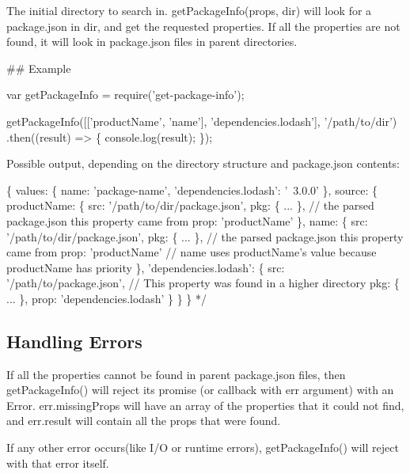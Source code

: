 The initial directory to search in. {\ttfamily get\+Package\+Info(props, dir)} will look for a package.\+json in {\ttfamily dir}, and get the requested properties. If all the properties are not found, it will look in package.\+json files in parent directories.

\#\# Example 
\begin{DoxyCode}
var getPackageInfo = require('get-package-info');

getPackageInfo([['productName', 'name'], 'dependencies.lodash'], '/path/to/dir')
.then((result) => \{
    console.log(result);
\});
\end{DoxyCode}


Possible output, depending on the directory structure and package.\+json contents\+:


\begin{DoxyCode}
\{
    values: \{
        name: 'package-name',
        'dependencies.lodash': '~3.0.0'
    \},
    source: \{
        productName: \{
            src: '/path/to/dir/package.json',
            pkg: \{ ... \}, // the parsed package.json this property came from
            prop: 'productName'
        \},
        name: \{
            src: '/path/to/dir/package.json',
            pkg: \{ ... \}, // the parsed package.json this property came from
            prop: 'productName' // name uses productName's value because productName has priority
        \},
        'dependencies.lodash': \{
            src: '/path/to/package.json', // This property was found in a higher directory
            pkg: \{ ... \},
            prop: 'dependencies.lodash'
        \}
    \}
\}
*/
\end{DoxyCode}


\subsection*{Handling Errors}

If all the properties cannot be found in parent package.\+json files, then {\ttfamily get\+Package\+Info()} will reject it\textquotesingle{}s promise (or callback with err argument) with an Error. {\ttfamily err.\+missing\+Props} will have an array of the properties that it could not find, and {\ttfamily err.\+result} will contain all the props that were found.

If any other error occurs(like I/O or runtime errors), {\ttfamily get\+Package\+Info()} will reject with that error itself. 